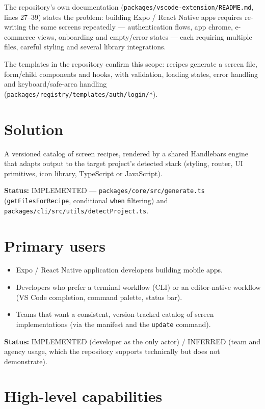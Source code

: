 The repository's own documentation (\texttt{packages/vscode-extension/README.md},
lines 27--39) states the problem: building Expo / React Native apps requires
re-writing the same screens repeatedly --- authentication flows, app chrome,
e-commerce views, onboarding and empty/error states --- each requiring multiple
files, careful styling and several library integrations.

The templates in the repository confirm this scope: recipes generate a screen
file, form/child components and hooks, with validation, loading states, error
handling and keyboard/safe-area handling
(\texttt{packages/registry/templates/auth/login/*}).

\section{Solution}

A versioned catalog of screen recipes, rendered by a shared Handlebars engine
that adapts output to the target project's detected stack (styling, router,
UI primitives, icon library, TypeScript or JavaScript).

\textbf{Status:} IMPLEMENTED --- \texttt{packages/core/src/generate.ts}
(\texttt{getFilesForRecipe}, conditional \texttt{when} filtering) and
\texttt{packages/cli/src/utils/detectProject.ts}.

\section{Primary users}

\begin{itemize}
  \item Expo / React Native application developers building mobile apps.
  \item Developers who prefer a terminal workflow (CLI) or an editor-native
        workflow (VS Code completion, command palette, status bar).
  \item Teams that want a consistent, version-tracked catalog of screen
        implementations (via the manifest and the \texttt{update} command).
\end{itemize}

\textbf{Status:} IMPLEMENTED (developer as the only actor) /
INFERRED (team and agency usage, which the repository supports technically but
does not demonstrate).

\section{High-level capabilities}

